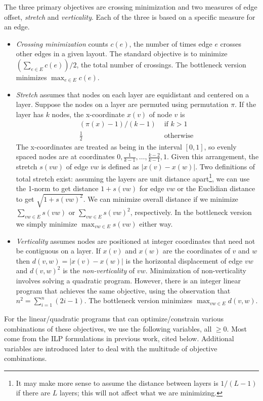 The three primary objectives are crossing minimization and two measures of edge offset, \emph{stretch} and \emph{verticality}. Each of the three is based on a specific measure for an edge.
\begin{itemize}
    \item
    \emph{Crossing minimization} counts $c(e)$, the number of times edge $e$ crosses other edges in a given layout. The standard objective is to minimize $(\sum_{e\in E} c(e))/2$, the total number of crossings. The bottleneck version minimizes $\max_{e \in E} c(e)$.
    \item
    \emph{Stretch} assumes that nodes on each layer are equidistant and centered on a layer. Suppose the nodes on a layer are permuted using permutation $\pi$. If the layer has $k$ nodes, the x-coordinate $x(v)$ of node $v$ is
    \begin{eqnarray*}
    (\pi(x)-1) / (k-1) & \mbox{ if } k > 1 \\
    \frac{1}{2} & \mbox{ otherwise }        
    \end{eqnarray*}
    The x-coordinates are treated as being in the interval $[0,1]$, so evenly spaced nodes are at coordinates $0,\frac{1}{k-1},\ldots,\frac{k-2}{k-1},1$. Given this arrangement, the stretch $s(vw)$ of edge $vw$ is defined as $|x(v)-x(w)|$. Two definitions of total stretch exist: assuming the layers are unit distance apart\footnote{It may make more sense to assume the distance between layers is $1/(L-1)$ if there are $L$ layers; this will not affect what we are minimizing.}, we can use the 1-norm to get distance $1+s(vw)$ for edge $vw$ or the Euclidian distance to get $\sqrt{1 + s(vw)^2}$. We can minimize overall distance if we minimize $\sum_{vw\in E} s(vw)$ or $\sum_{vw\in E} s(vw)^2$, respectively. In the bottleneck version we simply minimize $\max_{vw\in E} s(vw)$ either way.
    \item
    \emph{Verticality} assumes nodes are positioned at integer coordinates that need not be contiguous on a layer. If $x(v)$ and $x(w)$ are the coordinates of $v$ and $w$ then $d(v,w) = |x(v)-x(w)|$ is the horizontal displacement of edge $vw$ and $d(v,w)^2$ is the \emph{non-verticality} of $vw$.
    Minimization of non-verticality involves solving a quadratic program. However, there is an integer linear program that achieves the same objective, using the observation that $n^2 = \sum_{i=1}^n (2i-1)$. The bottleneck version minimizes $\max_{vw\in E} d(v,w)$.
\end{itemize}

For the linear/quadratic programs that can optimize/constrain various combinations of these objectives, we use the following variables, all $\geq 0$. Most come from the ILP formulations in previous work, cited below.
Additional variables are introduced later to deal with the multitude of objective combinations.

